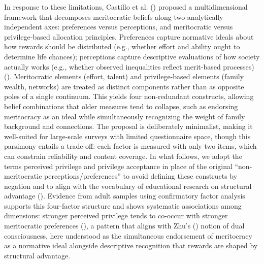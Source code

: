 \documentclass[
  13pt,
]{article}
\begin{document}
In response to these limitations, Castillo et al.
() proposed a
multidimensional framework that decomposes meritocratic beliefs along
two analytically independent axes: preferences versus perceptions, and
meritocratic versus privilege-based allocation principles. Preferences
capture normative ideals about how rewards should be distributed (e.g.,
whether effort and ability ought to determine life chances); perceptions
capture descriptive evaluations of how society actually works (e.g.,
whether observed inequalities reflect merit-based processes)
(). Meritocratic
elements (effort, talent) and privilege-based elements (family wealth,
networks) are treated as distinct components rather than as opposite
poles of a single continuum. This yields four non-redundant constructs,
allowing belief combinations that older measures tend to collapse, such
as endorsing meritocracy as an ideal while simultaneously recognizing
the weight of family background and connections. The proposal is
deliberately minimalist, making it well-suited for large-scale surveys
with limited questionnaire space, though this parsimony entails a
trade-off: each factor is measured with only two items, which can
constrain reliability and content coverage. In what follows, we adopt
the terms perceived privilege and privilege acceptance in place of the
original ``non-meritocratic perceptions/preferences'' to avoid defining
these constructs by negation and to align with the vocabulary of
educational research on structural advantage
(). Evidence from adult
samples using confirmatory factor analysis supports this four-factor
structure and shows systematic associations among dimensions: stronger
perceived privilege tends to co-occur with stronger meritocratic
preferences (), a pattern that aligns with Zhu's
() notion of dual
consciousness, here understood as the simultaneous endorsement of
meritocracy as a normative ideal alongside descriptive recognition that
rewards are shaped by structural advantage.
\end{document}

